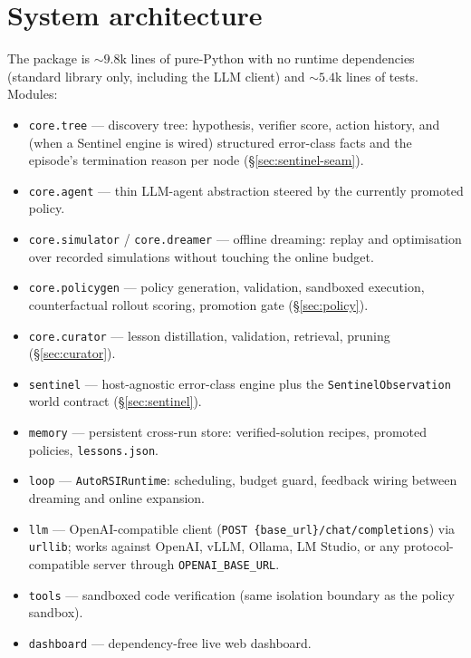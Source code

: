 \documentclass[11pt,a4paper]{article}
\begin{document}
\section{System architecture}

The package is ${\sim}9.8$k lines of pure-Python with no runtime dependencies
(standard library only, including the LLM client) and ${\sim}5.4$k lines of tests.
Modules:

\begin{itemize}
  \item \texttt{core.tree} --- discovery tree: hypothesis, verifier score,
  action history, and (when a Sentinel engine is wired) structured
  error-class facts and the episode's termination reason per node
  (\S\ref{sec:sentinel-seam}).
  \item \texttt{core.agent} --- thin LLM-agent abstraction steered by the
  currently promoted policy.
  \item \texttt{core.simulator} / \texttt{core.dreamer} --- offline dreaming:
  replay and optimisation over recorded simulations without touching the
  online budget.
  \item \texttt{core.policygen} --- policy generation, validation, sandboxed
  execution, counterfactual rollout scoring, promotion gate
  (\S\ref{sec:policy}).
  \item \texttt{core.curator} --- lesson distillation, validation, retrieval,
  pruning (\S\ref{sec:curator}).
  \item \texttt{sentinel} --- host-agnostic error-class engine plus the
  \texttt{SentinelObservation} world contract (\S\ref{sec:sentinel}).
  \item \texttt{memory} --- persistent cross-run store: verified-solution
  recipes, promoted policies, \texttt{lessons.json}.
  \item \texttt{loop} --- \texttt{AutoRSIRuntime}: scheduling, budget guard,
  feedback wiring between dreaming and online expansion.
  \item \texttt{llm} --- OpenAI-compatible client
  (\texttt{POST \{base\_url\}/chat/completions}) via \texttt{urllib}; works
  against OpenAI, vLLM, Ollama, LM Studio, or any protocol-compatible server
  through \texttt{OPENAI\_BASE\_URL}.
  \item \texttt{tools} --- sandboxed code verification (same isolation
  boundary as the policy sandbox).
  \item \texttt{dashboard} --- dependency-free live web dashboard.
\end{itemize}
\end{document}
